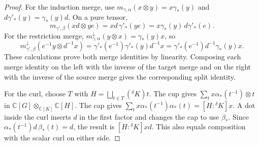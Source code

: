 \documentclass[11pt,a4paper]{article}
\numberwithin{equation}{section}
\theoremstyle{definition}
\newcommand{\C}{\mathbb C}
\newcommand{\cg}[2]{{}^{#1}\!#2}
\begin{document}
\begin{proof}
For the induction merge, use \(m_{\gamma,\alpha}(x\otimes y)=x\gamma_*(y)\)
and \(d\gamma'_*(y)=\gamma_*(y)d\). On a pure tensor,
\[
 m_{\gamma',\beta}(xd\otimes ye)
   =xd\,\gamma'_*(ye)
   =x\gamma_*(y)\,d\gamma'_*(e).
\]
For the restriction merge, \(m^\downarrow_{\gamma,\alpha}(y\otimes x)
=\gamma_*(y)x\), so
\[
 m^\downarrow_{\gamma',\beta}(e^{-1}y\otimes d^{-1}x)
   =\gamma'_*(e^{-1})\gamma'_*(y)d^{-1}x
   =\gamma'_*(e^{-1})d^{-1}\gamma_*(y)x .
\]
These calculations prove both merge identities by linearity. Composing
each merge identity on the left with the inverse of the target merge and
on the right with the inverse of the source merge gives the corresponding
split identity.

For the curl, choose \(T\) with \(H=\bigsqcup_{t\in T}(\cg{\delta}{K})t\).
The cup gives \(\sum_t x\alpha_*(t^{-1})\otimes t\) in
\(\C[G]\otimes_{\C[K]}\C[H]\). The cap gives
\(\sum_t x\alpha_*(t^{-1})\alpha_*(t)=[H:\cg{\delta}{K}]x\).
A dot inside the curl inserts \(d\) in the first factor and changes
the cap to use \(\beta_*\). Since
\(\alpha_*(t^{-1})d\,\beta_*(t)=d\), the result is
\([H:\cg{\delta}{K}]xd\). This also equals composition with the
scalar curl on either side.
\end{proof}


\begin{center}
\begin{minipage}{.98\linewidth}
\centering
{}
\end{minipage}
\end{center}
\end{document}
